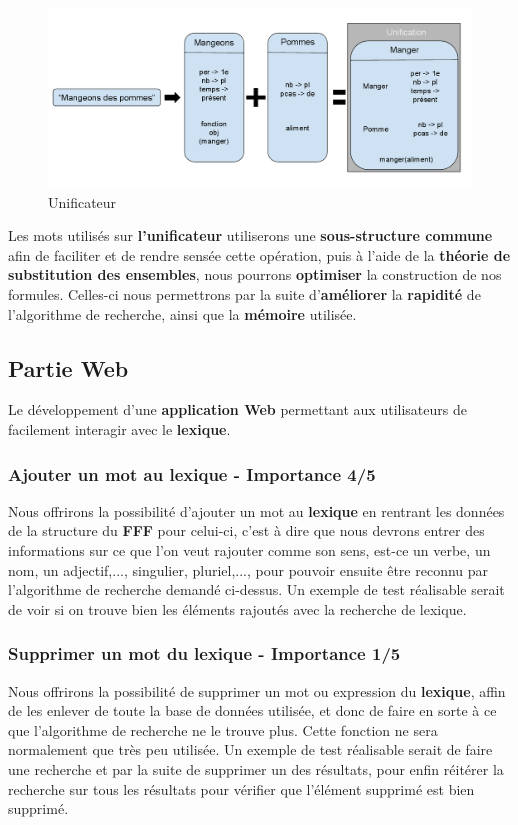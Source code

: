 \begin{figure}[ht]
    \centering
    \includegraphics[scale=0.4]{unificateur.png}
    \caption{Unificateur }
\end{figure}

{Les mots utilisés sur \textbf{l'unificateur} utiliserons une \textbf{sous-structure commune} afin de faciliter et de rendre sensée cette opération, puis à l'aide de la \textbf{théorie de substitution des ensembles}, nous pourrons \textbf{optimiser} la construction de nos formules. Celles-ci nous permettrons par la suite d'\textbf{améliorer} la \textbf{rapidité} de l'algorithme de recherche, ainsi que la \textbf{mémoire} utilisée.\par}

\subsection{Partie Web}
Le développement d'une \textbf{application Web} permettant aux utilisateurs de facilement interagir avec le \textbf{lexique}.

\subsubsection{Ajouter un mot au lexique - Importance 4/5}

{Nous offrirons la possibilité d'ajouter un mot au \textbf{lexique} en rentrant les données de la structure du \textbf{FFF} pour celui-ci, c'est à dire que nous devrons entrer des informations sur ce que l'on veut rajouter comme son sens, est-ce un verbe, un nom, un adjectif,..., singulier, pluriel,..., pour pouvoir ensuite être reconnu par l'algorithme de recherche demandé ci-dessus. Un exemple de test réalisable serait de voir si on trouve bien les éléments rajoutés avec la recherche de lexique.\par}

\subsubsection{Supprimer un mot du lexique - Importance 1/5}
{Nous offrirons la possibilité de supprimer un mot ou expression du \textbf{lexique}, affin de les enlever de toute la base de données utilisée, et donc de faire en sorte à ce que l'algorithme de recherche ne le trouve plus. Cette fonction ne sera normalement que très peu utilisée. Un exemple de test réalisable serait de faire une recherche et par la suite de supprimer un des résultats, pour enfin réitérer la recherche sur tous les résultats pour vérifier que l'élément supprimé est bien supprimé.\par}

